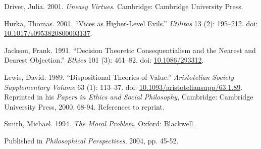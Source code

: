 \documentclass[
  10pt,
  letterpaper,
  DIV=11,
  numbers=noendperiod,
  twoside]{scrartcl}
\newlength{\cslhangindent}
\newenvironment{CSLReferences}[2] %
 {\begin{list}{}{%
  \setlength{\itemindent}{0pt}
  \setlength{\leftmargin}{0pt}
  \setlength{\parsep}{0pt}
  \ifodd #1
   \setlength{\leftmargin}{\cslhangindent}
   \setlength{\itemindent}{-1\cslhangindent}
  \fi
  \setlength{\itemsep}{#2\baselineskip}}}
 {\end{list}}
\begin{document}
\label{refs}
\begin{CSLReferences}{1}{0}
Driver, Julia. 2001. \emph{Uneasy Virtues}. Cambridge: Cambridge
University Press.

Hurka, Thomas. 2001. {``Vices as Higher-Level Evils.''} \emph{Utilitas}
13 (2): 195--212. doi:
\href{https://doi.org/10.1017/s0953820800003137}{10.1017/s0953820800003137}.

Jackson, Frank. 1991. {``Decision Theoretic Consequentialism and the
Nearest and Dearest Objection.''} \emph{Ethics} 101 (3): 461--82. doi:
\href{https://doi.org/10.1086/293312}{10.1086/293312}.

Lewis, David. 1989. {``Dispositional Theories of Value.''}
\emph{Aristotelian Society Supplementary Volume} 63 (1): 113--37. doi:
\href{https://doi.org/10.1093/aristoteliansupp/63.1.89}{10.1093/aristoteliansupp/63.1.89}.
Reprinted in his \emph{Papers in Ethics and Social Philosophy},
Cambridge: Cambridge University Press, 2000, 68-94. References to
reprint.

Smith, Michael. 1994. \emph{The Moral Problem}. Oxford: Blackwell.

\end{CSLReferences}



\noindent Published in\emph{
Philosophical Perspectives}, 2004, pp. 45-52.
\end{document}
